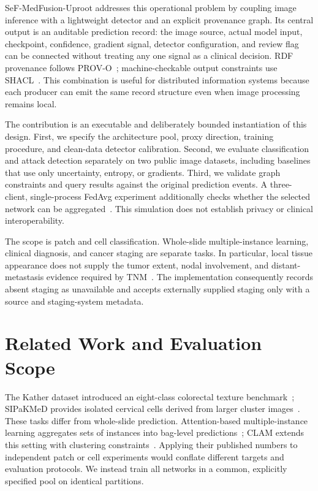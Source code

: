 \documentclass{svproc}
\begin{document}
SeF-MedFusion-Uproot addresses this operational problem by coupling image inference with a lightweight detector and an explicit provenance graph. Its central output is an auditable prediction record: the image source, actual model input, checkpoint, confidence, gradient signal, detector configuration, and review flag can be connected without treating any one signal as a clinical decision. RDF provenance follows PROV-O~\cite{prov2013}; machine-checkable output constraints use SHACL~\cite{shacl2017}. This combination is useful for distributed information systems because each producer can emit the same record structure even when image processing remains local.

The contribution is an executable and deliberately bounded instantiation of this design. First, we specify the architecture pool, proxy direction, training procedure, and clean-data detector calibration. Second, we evaluate classification and attack detection separately on two public image datasets, including baselines that use only uncertainty, entropy, or gradients. Third, we validate graph constraints and query results against the original prediction events. A three-client, single-process FedAvg experiment additionally checks whether the selected network can be aggregated~\cite{mcmahan2017}. This simulation does not establish privacy or clinical interoperability.

The scope is patch and cell classification. Whole-slide multiple-instance learning, clinical diagnosis, and cancer staging are separate tasks. In particular, local tissue appearance does not supply the tumor extent, nodal involvement, and distant-metastasis evidence required by TNM~\cite{nci2025}. The implementation consequently records absent staging as unavailable and accepts externally supplied staging only with a source and staging-system metadata.

\section{Related Work and Evaluation Scope}
The Kather dataset introduced an eight-class colorectal texture benchmark~\cite{kather2016,katherdata2016}; SIPaKMeD provides isolated cervical cells derived from larger cluster images~\cite{plissiti2018}. These tasks differ from whole-slide prediction. Attention-based multiple-instance learning aggregates sets of instances into bag-level predictions~\cite{ilse2018}; CLAM extends this setting with clustering constraints~\cite{lu2021}. Applying their published numbers to independent patch or cell experiments would conflate different targets and evaluation protocols. We instead train all networks in a common, explicitly specified pool on identical partitions.
\end{document}
